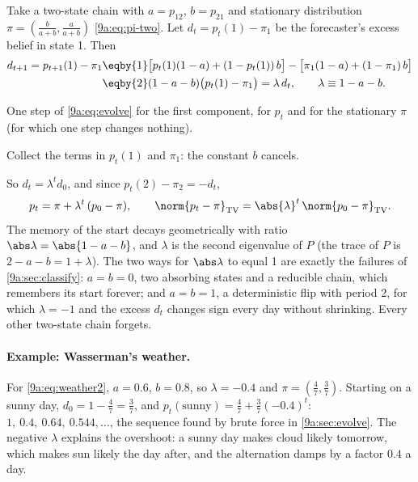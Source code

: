 Take a two-state chain with $a=p_{12}$, $b=p_{21}$ and stationary distribution
$\pi=(\frac{b}{a+b},\frac{a}{a+b})$ \eqref{9a:eq:pi-two}. Let $d_t=p_t(1)-\pi_1$ be the
forecaster's excess belief in state 1. Then
\begin{align}
  d_{t+1}=p_{t+1}(1)-\pi_1
  &\eqby{1}\bigl[p_t(1)(1-a)+(1-p_t(1))\,b\bigr]-\bigl[\pi_1(1-a)+(1-\pi_1)\,b\bigr]
  \nonumber\\
  &\eqby{2}(1-a-b)\bigl(p_t(1)-\pi_1\bigr)
   =\lambda\,d_t,
  \qquad \lambda\equiv1-a-b .
  \label{9a:eq:two-state-step}
\end{align}
\begin{explain}
  \item One step of \eqref{9a:eq:evolve} for the first component, for $p_t$ and for the
        stationary $\pi$ (for which one step changes nothing).
  \item Collect the terms in $p_t(1)$ and $\pi_1$: the constant $b$ cancels.
\end{explain}
So $d_t=\lambda^td_0$, and since $p_t(2)-\pi_2=-d_t$,
\begin{equation}
  p_t=\pi+\lambda^t\,(p_0-\pi),\qquad
  \norm{p_t-\pi}_{\rm TV}=\abs{\lambda}^t\,\norm{p_0-\pi}_{\rm TV} .
  \label{9a:eq:two-state-solution}
\end{equation}
The memory of the start decays geometrically with ratio $\abs\lambda=\abs{1-a-b}$, and
$\lambda$ is the second eigenvalue of $P$ (the trace of $P$ is $2-a-b=1+\lambda$). The two ways
for $\abs\lambda$ to equal 1 are exactly the failures of \cref{9a:sec:classify}: $a=b=0$, two
absorbing states and a reducible chain, which remembers its start forever; and $a=b=1$, a
deterministic flip with period 2, for which $\lambda=-1$ and the excess $d_t$ changes sign
every day without shrinking. Every other two-state chain forgets.

\paragraph{Example: Wasserman's weather.}
For \eqref{9a:eq:weather2}, $a=0.6$, $b=0.8$, so $\lambda=-0.4$ and $\pi=(\tfrac47,\tfrac37)$.
Starting on a sunny day, $d_0=1-\tfrac47=\tfrac37$, and
$p_t(\text{sunny})=\tfrac47+\tfrac37(-0.4)^t$: $1,\ 0.4,\ 0.64,\ 0.544,\dots$, the sequence
found by brute force in \cref{9a:sec:evolve}. The negative $\lambda$ explains the overshoot: a
sunny day makes cloud likely tomorrow, which makes sun likely the day after, and the
alternation damps by a factor $0.4$ a day.

